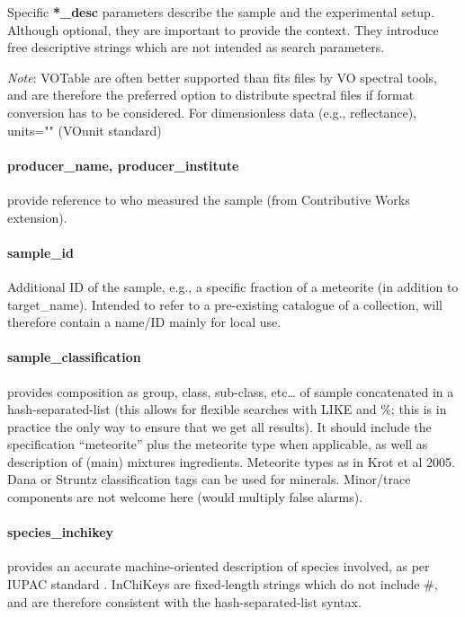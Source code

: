 \documentclass[11pt,a4paper]{ivoa}
\begin{document}
Specific \textbf{*\_desc} parameters describe the sample and the
experimental setup. Although optional, they are important to provide the
context. They introduce free descriptive strings which are not intended
as search parameters.

\emph{Note}: VOTable are often better supported than fits files by VO
spectral tools, and are therefore the preferred option to distribute
spectral files if format conversion has to be considered. For
dimensionless data (e.g., reflectance), units="" (VOunit standard)

\paragraph{producer\_name, producer\_institute}

provide reference to who measured the sample
(from Contributive Works extension).

\paragraph{sample\_id}

Additional ID of the sample, e.g., a specific fraction of a meteorite
(in addition to target\_name).
Intended to refer to a pre-existing catalogue of a collection,
will therefore contain a name/ID mainly for local use.

\paragraph{sample\_classification}

provides composition as group, class, sub-class, etc… of sample
concatenated in a hash-separated-list (this allows for flexible searches
with LIKE and \%; this is in practice the only way to ensure that we
get all results). It should include the specification ``meteorite''
plus the meteorite type when applicable, as well as description of
(main) mixtures ingredients. Meteorite types as in Krot et al 2005. Dana
or Struntz classification tags can be used for minerals. Minor/trace
components are not welcome here (would multiply false alarms).

\paragraph{\textbf{species\_inchikey} }

provides an accurate machine-oriented description of species involved, 
as per IUPAC standard \citep{heller2015}. InChiKeys are fixed-length strings 
which do not include \#, and are therefore consistent with the 
hash-separated-list syntax.
\end{document}
